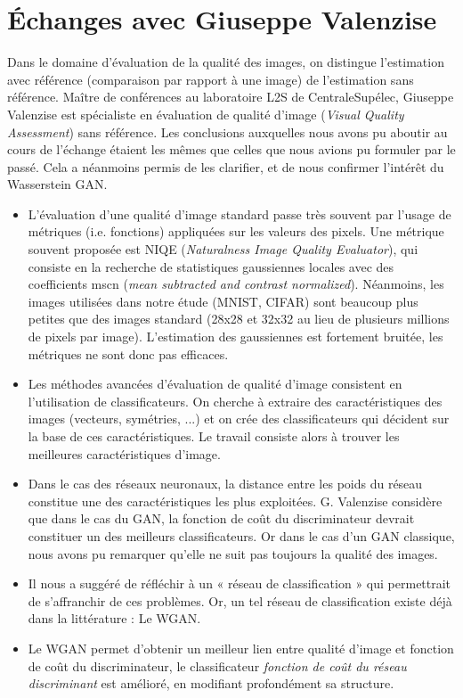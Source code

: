 \section{Échanges avec Giuseppe Valenzise}
\label{giuseppe-valenzise}
Dans le domaine d'évaluation de la qualité des images, on distingue l'estimation avec référence (comparaison par rapport à une image) de l'estimation sans référence.
Maître de conférences au laboratoire L2S de CentraleSupélec, Giuseppe Valenzise est spécialiste en évaluation de qualité d'image (\textit{Visual Quality Assessment}) sans référence.
Les conclusions auxquelles nous avons pu aboutir au cours de l'échange étaient les mêmes que celles que nous avions pu formuler par le passé. Cela a néanmoins permis de les clarifier, et de nous confirmer l'intérêt du Wasserstein GAN. 
\begin{itemize}
\item L'évaluation d'une qualité d'image standard passe très souvent par l'usage de métriques (i.e. fonctions) appliquées sur les valeurs des pixels. Une métrique souvent proposée est NIQE (\textit{Naturalness Image Quality Evaluator}), qui consiste en la recherche de statistiques gaussiennes locales avec des coefficients mscn (\textit{mean subtracted and contrast normalized}). Néanmoins, les images utilisées dans notre étude (MNIST, CIFAR) sont beaucoup plus petites que des images standard (28x28 et 32x32 au lieu de plusieurs millions de pixels par image). L'estimation des gaussiennes est fortement bruitée, les métriques ne sont donc pas efficaces.
\item Les méthodes avancées d'évaluation de qualité d'image consistent en l'utilisation de classificateurs. On cherche à extraire des caractéristiques des images (vecteurs, symétries, ...) et on crée des classificateurs qui décident sur la base de ces caractéristiques. Le travail consiste alors à trouver les meilleures caractéristiques d'image.
\item Dans le cas des réseaux neuronaux, la distance entre les poids du réseau constitue une des caractéristiques les plus exploitées. G. Valenzise considère que dans le cas du GAN, la fonction de coût du discriminateur devrait constituer un des meilleurs classificateurs. Or dans le cas d'un GAN classique, nous avons pu remarquer qu'elle ne suit pas toujours la qualité des images.
\item Il nous a suggéré de réfléchir à un « réseau de classification » qui permettrait de s'affranchir de ces problèmes. Or, un tel réseau de classification existe déjà dans la littérature : Le WGAN.  
\item Le WGAN permet d'obtenir un meilleur lien entre qualité d'image et fonction de coût du discriminateur, le classificateur \textit{fonction de coût du réseau discriminant} est amélioré, en modifiant profondément sa structure.
\end{itemize}

